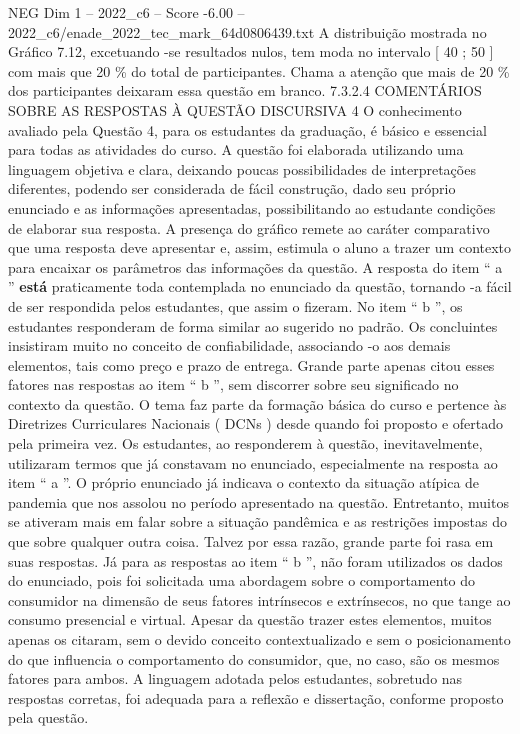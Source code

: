 \begin{textsample}{NEG Dim 1 – 2022\_c6 – Score -6.00 – 2022\_c6/enade\_2022\_tec\_mark\_64d0806439.txt}
A distribuição mostrada no Gráfico 7.12, excetuando -se resultados nulos, tem moda no intervalo [ 40 ; 50 ] com mais que 20 \% do total de participantes.
Chama a atenção que mais de 20 \% dos participantes deixaram essa questão em branco. 7.3.2.4 COMENTÁRIOS SOBRE AS RESPOSTAS À QUESTÃO DISCURSIVA 4 O conhecimento avaliado pela Questão 4, para os estudantes da graduação, é básico e essencial para todas as atividades do curso.
A questão foi elaborada utilizando uma linguagem objetiva e clara, deixando poucas possibilidades de interpretações diferentes, podendo ser considerada de fácil construção, dado seu próprio enunciado e as informações apresentadas, possibilitando ao estudante condições de elaborar sua resposta.
A presença do gráfico remete ao caráter comparativo que uma resposta deve apresentar e, assim, estimula o aluno a trazer um contexto para encaixar os parâmetros das informações da questão.
A resposta do item “ a ” \textbf{está} praticamente toda contemplada no enunciado da questão, tornando -a fácil de ser respondida pelos estudantes, que assim o fizeram.
No item “ b ”, os estudantes responderam de forma similar ao sugerido no padrão.
Os concluintes insistiram muito no conceito de confiabilidade, associando -o aos demais elementos, tais como preço e prazo de entrega.
Grande parte apenas citou esses fatores nas respostas ao item “ b ”, sem discorrer sobre seu significado no contexto da questão.
O tema faz parte da formação básica do curso e pertence às Diretrizes Curriculares Nacionais ( DCNs ) desde quando foi proposto e ofertado pela primeira vez.
Os estudantes, ao responderem à questão, inevitavelmente, utilizaram termos que já constavam no enunciado, especialmente na resposta ao item “ a ”.
O próprio enunciado já indicava o contexto da situação atípica de pandemia que nos assolou no período apresentado na questão.
Entretanto, muitos se ativeram mais em falar sobre a situação pandêmica e as restrições impostas do que sobre qualquer outra coisa.
Talvez por essa razão, grande parte foi rasa em suas respostas.
Já para as respostas ao item “ b ”, não foram utilizados os dados do enunciado, pois foi solicitada uma abordagem sobre o comportamento do consumidor na dimensão de seus fatores intrínsecos e extrínsecos, no que tange ao consumo presencial e virtual.
Apesar da questão trazer estes elementos, muitos apenas os citaram, sem o devido conceito contextualizado e sem o posicionamento do que influencia o comportamento do consumidor, que, no caso, são os mesmos fatores para ambos.
A linguagem adotada pelos estudantes, sobretudo nas respostas corretas, foi adequada para a reflexão e dissertação, conforme proposto pela questão.

\end{textsample}
